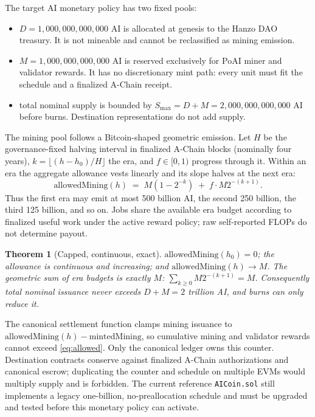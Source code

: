 \documentclass[11pt,a4paper]{article}
\newtheorem{theorem}{Theorem}
\begin{document}
The target AI monetary policy has two fixed pools:
\begin{itemize}
  \item $D = 1{,}000{,}000{,}000{,}000$ AI is allocated at genesis to the Hanzo DAO treasury. It is not mineable and cannot be reclassified as mining emission.
  \item $M = 1{,}000{,}000{,}000{,}000$ AI is reserved exclusively for PoAI miner and validator rewards. It has no discretionary mint path: every unit must fit the schedule and a finalized A-Chain receipt.
  \item total nominal supply is bounded by $S_{\max}=D+M=2{,}000{,}000{,}000{,}000$ AI before burns. Destination representations do not add supply.
\end{itemize}

The mining pool follows a Bitcoin-shaped geometric emission. Let $H$ be the governance-fixed halving interval in finalized A-Chain blocks (nominally four years), $k=\lfloor(h-h_0)/H\rfloor$ the era, and $f\in[0,1)$ progress through it. Within an era the aggregate allowance vests linearly and its slope halves at the next era:
\begin{equation}\label{eq:allowed}
  \text{allowedMining}(h) \;=\; M(1 - 2^{-k}) \;+\; f \cdot M 2^{-(k+1)} .
\end{equation}
Thus the first era may emit at most 500 billion AI, the second 250 billion, the third 125 billion, and so on. Jobs share the available era budget according to finalized useful work under the active reward policy; raw self-reported FLOPs do not determine payout.

\begin{theorem}[Capped, continuous, exact]\label{thm:cap}
$\text{allowedMining}(h_0)=0$; the allowance is continuous and increasing; and $\text{allowedMining}(h)\to M$. The geometric sum of era budgets is exactly $M$: $\sum_{k\ge0}M2^{-(k+1)}=M$. Consequently total nominal issuance never exceeds $D+M=2$ trillion AI, and burns can only reduce it.
\end{theorem}

The canonical settlement function clamps mining issuance to $\text{allowedMining}(h)-\text{mintedMining}$, so cumulative mining and validator rewards cannot exceed \eqref{eq:allowed}. Only the canonical ledger owns this counter. Destination contracts conserve against finalized A-Chain authorizations and canonical escrow; duplicating the counter and schedule on multiple EVMs would multiply supply and is forbidden. The current reference \texttt{AICoin.sol} still implements a legacy one-billion, no-preallocation schedule and must be upgraded and tested before this monetary policy can activate.
\end{document}
